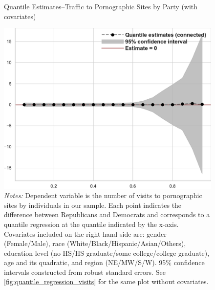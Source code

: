 \documentclass[12pt, letterpaper]{article}
\begin{document}
\begin{figure}
	\centering
	\caption{Quantile Estimates--Traffic to Pornographic Sites by Party (with covariates)}
	\includegraphics[width=.55\linewidth]{../figs/quantile_reg_covariates_visits_adult.pdf}
	\caption*{\footnotesize \emph{Notes:} 
		Dependent variable is the number of visits to pornographic sites by individuals in our sample.
		Each point indicates the difference between Republicans and Democrats and corresponds to a quantile regression at the quantile indicated by the x-axis.
		Covariates included on the right-hand side are: gender (Female/Male), race (White/Black/Hispanic/Asian/Others), education level (no HS/HS graduate/some college/college graduate), age and its quadratic, and region (NE/MW/S/W).
		95\% confidence intervals constructed from robust standard errors.
		See \cref{fig:quantile_regression_visits} for the same plot without covariates.
	}
	\label{fig:quantile_regression_visits_covariates}
\end{figure}
\end{document}
